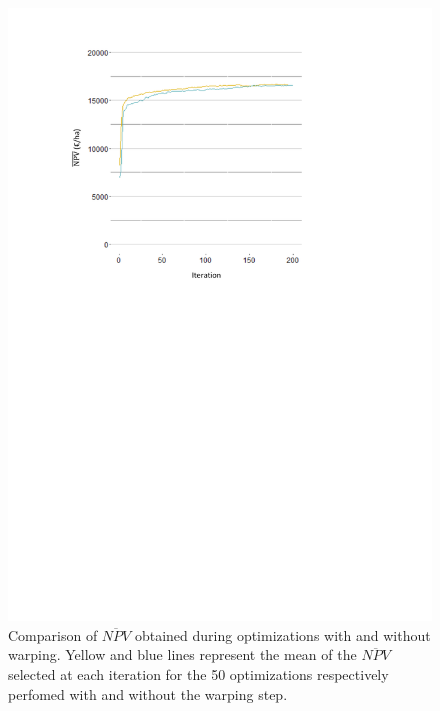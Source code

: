 \begin{figure}[!ht]
	\centering
	\includegraphics[trim = 2cm 15cm 5cm 1cm, clip]{Figures_Warping_resultats_courbes_moyennes_mean_NPV_warping_sanswarping.pdf}
	\caption{Comparison of $\overline{NPV}$ obtained during optimizations with and without warping. 
	Yellow and blue lines represent the mean of the $\overline{NPV}$ selected at each iteration for the 50 optimizations respectively perfomed with and without the warping step. }\label{fig:moyennesNPV}
\end{figure}

